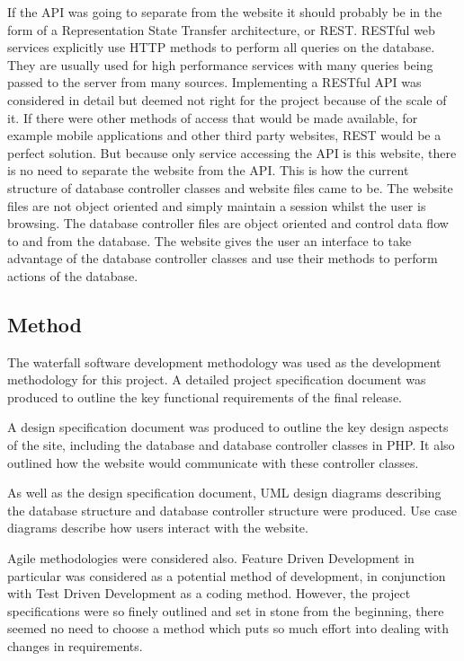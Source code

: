 		If the API was going to separate from the website it should probably be in the form of a Representation State Transfer architecture, or REST. RESTful web services explicitly use HTTP methods to perform all queries on the database. They are usually used for high performance services with many queries being passed to the server from many sources. Implementing a RESTful API was considered in detail but deemed not right for the project because of the scale of it. If there were other methods of access that would be made available, for example mobile applications and other third party websites, REST would be a perfect solution. But because only service accessing the API is this website, there is no need to separate the website from the API. This is how the current structure of database controller classes and website files came to be. The website files are not object oriented and simply maintain a session whilst the user is browsing. The database controller files are object oriented and control data flow to and from the database. The website gives the user an interface to take advantage of the database controller classes and use their methods to perform actions of the database.
		
	\subsection{Method}
		The waterfall software development methodology was used as the development methodology for this project. A detailed project specification document was produced to outline the key functional requirements of the final release. 
		
		A design specification document was produced to outline the key design aspects of the site, including the database and database controller classes in PHP. It also outlined how the website would communicate with these controller classes.
		
		As well as the design specification document, UML design diagrams describing the database structure and database controller structure were produced. Use case diagrams describe how users interact with the website.
		
		Agile methodologies were considered also. Feature Driven Development in particular was considered as a potential method of development, in conjunction with Test Driven Development as a coding method. However, the project specifications were so finely outlined and set in stone from the beginning, there seemed no need to choose a method which puts so much effort into dealing with changes in requirements.
		
